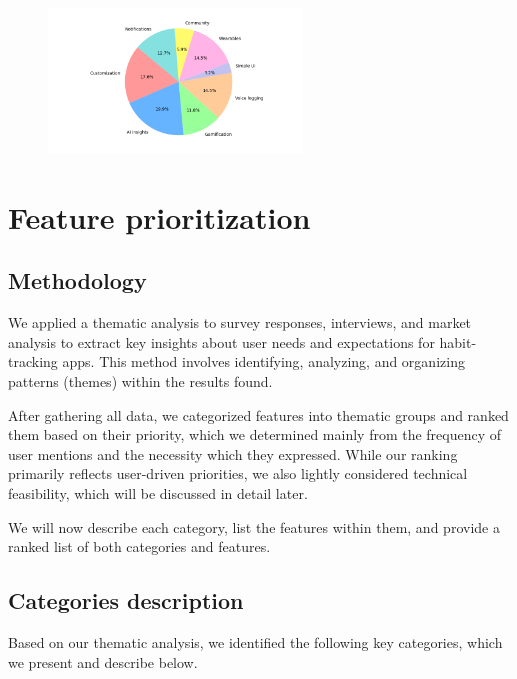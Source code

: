 \documentclass{article}
\begin{document}
\begin{figure}[H]
    \centering
    \includegraphics[width=0.6\textwidth]{images/user-aspects.png}
\end{figure}

\section{Feature prioritization}

\subsection{Methodology}

We applied a thematic analysis to survey responses, interviews, and market analysis to extract key insights about user needs and expectations for habit-tracking apps.
This method involves identifying, analyzing, and organizing patterns (themes) within the results found.

After gathering all data, we categorized features into thematic groups and ranked them based on their priority, which we determined mainly from the frequency of user mentions and the necessity which they expressed.
While our ranking primarily reflects user-driven priorities, we also lightly considered technical feasibility, which will be discussed in detail later.

We will now describe each category, list the features within them, and provide a ranked list of both categories and features.

\subsection{Categories description}

Based on our thematic analysis, we identified the following key categories, which we present and describe below.
\end{document}
